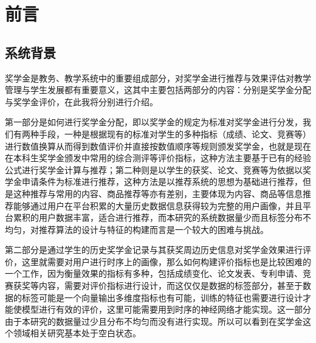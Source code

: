 %
%
%
%
%
%

\chapter{前言}

\section{系统背景}
奖学金是教务、教学系统中的重要组成部分，对奖学金进行推荐与效果评估对教学管理与学生发展都有重要意义，这其中主要包括两部分的内容：分别是奖学金分配与奖学金评价，在此我将分别进行介绍。

第一部分是如何进行奖学金分配，即以奖学金的规定为标准对奖学金进行分发，我们有两种手段，一种是根据现有的标准对学生的多种指标（成绩、论文、竞赛等）进行数值换算从而得到数值评价并直接按数值顺序等规则颁发奖学金，也就是现在在本科生奖学金颁发中常用的综合测评等评价指标，这种方法主要基于已有的经验公式进行奖学金计算与推荐；第二种则是以学生的获奖、论文、竞赛等为依据以奖学金申请条件为标准进行推荐，这种方法是以推荐系统的思想为基础进行推荐，但是这种推荐与常用的内容、商品推荐等亦有差别，主要体现为内容、商品等信息推荐能够通过用户在平台积累的大量历史数据信息获得较为完整的用户画像，并且平台累积的用户数据丰富，适合进行推荐，而本研究的系统数据量少而且标签分布不均匀，对推荐算法的设计与特征的构建而言是一个较大的困难与挑战。

第二部分是通过学生的历史奖学金记录与其获奖周边历史信息对奖学金效果进行评价，这里就需要对用户进行时序上的画像，那么如何构建评价指标也是比较困难的一个工作，因为衡量效果的指标有多种，包括成绩变化、论文发表、专利申请、竞赛获奖等内容，需要对评价指标进行设计，而这仅仅是数据的标签部分，甚至于数据的标签可能是一个向量输出多维度指标也有可能，训练的特征也需要进行设计才能使模型进行有效的评价，这里可能需要用到时序的神经网络才能实现。这一部分由于本研究的数据量过少且分布不均匀而没有进行实现。所以可以看到在奖学金这个领域相关研究基本处于空白状态。

